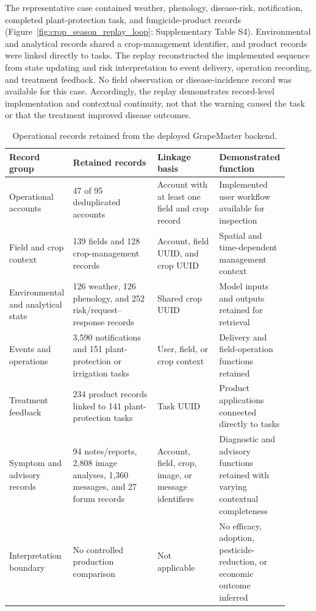 \documentclass[12pt]{article}
\begin{document}
The representative case contained weather, phenology, disease-risk, notification, completed plant-protection task, and fungicide-product records (Figure~\ref{fig:crop_season_replay_loop}; Supplementary Table S4). Environmental and analytical records shared a crop-management identifier, and product records were linked directly to tasks. The replay reconstructed the implemented sequence from state updating and risk interpretation to event delivery, operation recording, and treatment feedback. No field observation or disease-incidence record was available for this case. Accordingly, the replay demonstrates record-level implementation and contextual continuity, not that the warning caused the task or that the treatment improved disease outcomes.

\begin{table}[H]
\centering
\begingroup
\setlength{\tabcolsep}{3pt}
\renewcommand{\arraystretch}{1.12}
\scriptsize
\caption{Operational records retained from the deployed GrapeMaster backend.}
\label{tab:backend_operational_coverage}
\begin{minipage}{0.98\linewidth}
\begin{tabular}{p{0.21\linewidth} p{0.30\linewidth} p{0.22\linewidth} p{0.18\linewidth}}
\toprule
Record group & Retained records & Linkage basis & Demonstrated function \\
\midrule
Operational accounts & 47 of 95 deduplicated accounts & Account with at least one field and crop record & Implemented user workflow available for inspection \\
Field and crop context & 139 fields and 128 crop-management records & Account, field UUID, and crop UUID & Spatial and time-dependent management context \\
Environmental and analytical state & 126 weather, 126 phenology, and 252 risk/request--response records & Shared crop UUID & Model inputs and outputs retained for retrieval \\
Events and operations & 3,590 notifications and 151 plant-protection or irrigation tasks & User, field, or crop context & Delivery and field-operation functions retained \\
Treatment feedback & 234 product records linked to 141 plant-protection tasks & Task UUID & Product applications connected directly to tasks \\
Symptom and advisory records & 94 notes/reports, 2,808 image analyses, 1,360 messages, and 27 forum records & Account, field, crop, image, or message identifiers & Diagnostic and advisory functions retained with varying contextual completeness \\
Interpretation boundary & No controlled production comparison & Not applicable & No efficacy, adoption, pesticide-reduction, or economic outcome inferred \\
\bottomrule
\end{tabular}
\par\vspace{0.25em}{\raggedright\scriptsize Abbreviation: UUID, universally unique identifier.\par}
\end{minipage}
\endgroup
\end{table}
\end{document}
